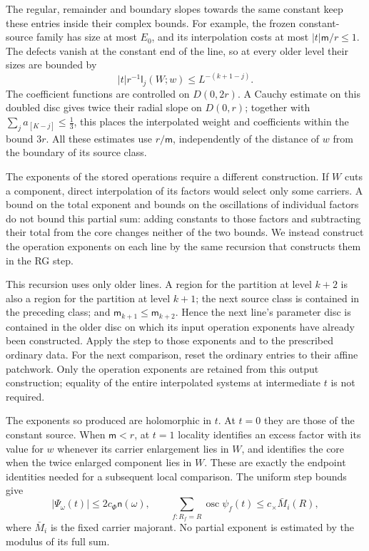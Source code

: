 \documentclass[11pt,letterpaper,reqno]{amsart}
\theoremstyle{definition}
\theoremstyle{remark}
\begin{document}
The regular, remainder and boundary slopes towards the same
constant keep these entries inside their complex bounds. For
example, the frozen constant-source family has size at most
$E_0$, and its interpolation costs at most
$|t|\mathsf m/r\le1$. The defects vanish at the constant end
of the line, so at every older level their sizes are bounded by
\[
 |t|r^{-1}\mathsf l_j(W;w)
                       \le L^{-(k+1-j)}.
\]
The coefficient functions are controlled on $D(0,2r)$.
A Cauchy estimate on this doubled disc gives twice their radial
slope on $D(0,r)$; together with
$\sum_j a_{[K-j]}\le\frac13$, this places the interpolated
weight and coefficients within the bound $3r$. All these estimates
use $r/\mathsf m$, independently of the distance of $w$ from the
boundary of its source class.

The exponents of the stored operations require a different
construction. If $W$ cuts a component, direct interpolation of
its factors would select only some carriers. A bound on the total
exponent and bounds on the oscillations of individual factors do
not bound this partial sum: adding constants to those factors and
subtracting their total from the core changes neither of the two
bounds. We instead construct the operation exponents on each line
by the same recursion that constructs them in the RG step.

This recursion uses only older lines. A region for the partition
at level $k+2$ is also a region for the partition at level $k+1$;
the next source class is contained in the preceding class; and
$\mathsf m_{k+1}\le\mathsf m_{k+2}$. Hence the next line's
parameter disc is contained in the older disc on which its input
operation exponents have already been constructed. Apply the
step to those exponents and to the prescribed ordinary data.
For the next comparison, reset the ordinary entries to their
affine patchwork. Only the operation exponents are retained from
this output construction; equality of the entire interpolated
systems at intermediate $t$ is not required.

The exponents so produced are holomorphic in $t$. At $t=0$ they
are those of the constant source. When $\mathsf m<r$, at $t=1$
locality identifies
an excess factor with its value for $w$ whenever its carrier
enlargement lies in $W$, and identifies the core when the twice
enlarged component lies in $W$. These are exactly the endpoint
identities needed for a subsequent local comparison. The uniform
step bounds give
\[
 |\Psi_\omega(t)|\le2c_\Phi\mathsf n(\omega),\qquad
 \sum_{f:R_f=R}\operatorname{osc}\psi_f(t)
                              \le c_\times\bar M_i(R),
\]
where $\bar M_i$ is the fixed carrier majorant. No partial
exponent is estimated by the modulus of its full sum.
\end{document}
